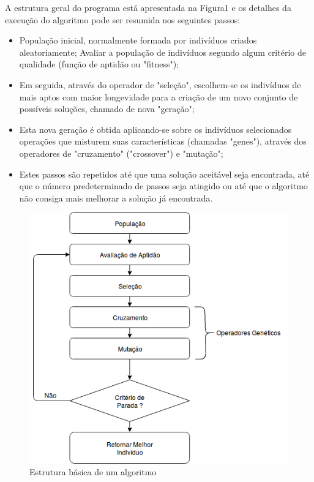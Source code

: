 \documentclass[conference]{IEEEtran}
\begin{document}
 A estrutura geral do programa está apresentada na Figura1 e os detalhes da execução do algoritmo pode ser resumida nos seguintes passos:
    \begin{itemize}
    \item População inicial, normalmente formada por indivíduos criados aleatoriamente;
    Avaliar a população de indivíduos segundo algum critério de qualidade (função de aptidão ou "fitness");
    
    \item Em seguida, através do operador de "seleção", escolhem-se os indivíduos de mais aptos com maior longevidade para a criação de um novo conjunto de possíveis soluções, chamado de nova "geração";
    
    \item Esta nova geração é obtida aplicando-se sobre os indivíduos selecionados operações que misturem suas características (chamadas "genes"), através dos operadores de "cruzamento" ("crossover") e "mutação";
    
    \item Estes passos são repetidos até que uma solução aceitável seja encontrada, até que o número predeterminado de passos seja atingido ou até que o algoritmo não consiga mais melhorar a solução já encontrada.
    \end{itemize}
    
    \begin{figure}[htbp]
    \centerline{\includegraphics[scale=0.4]{algoritmo-genetico.png}}
    \caption{Estrutura básica de um algoritmo}
    \label{fig}
    \end{figure}
    
\end{document}

